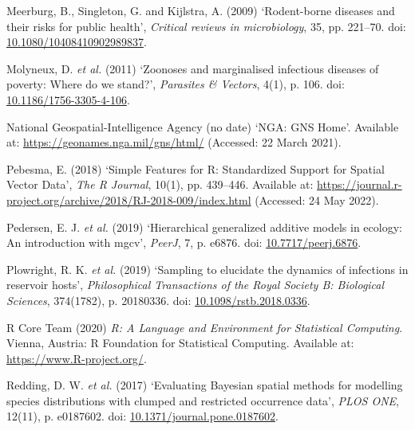 \documentclass[
]{article}
\newlength{\cslhangindent}
\newlength{\cslentryspacingunit} %
\newenvironment{CSLReferences}[2] %
 {%
  \setlength{\parindent}{0pt}
  \ifodd #1
  \let\oldpar\par
  \def\par{\hangindent=\cslhangindent\oldpar}
  \fi
  \setlength{\parskip}{#2\cslentryspacingunit}
 }%
 {}
\begin{document}
\begin{CSLReferences}{0}{0}
\leavevmode{}%
Meerburg, B., Singleton, G. and Kijlstra, A. (2009) {`Rodent-borne
diseases and their risks for public health'}, \emph{Critical reviews in
microbiology}, 35, pp. 221--70. doi:
\href{https://doi.org/10.1080/10408410902989837}{10.1080/10408410902989837}.

\leavevmode{}%
Molyneux, D. \emph{et al.} (2011) {`Zoonoses and marginalised infectious
diseases of poverty: {Where} do we stand?'}, \emph{Parasites \&
Vectors}, 4(1), p. 106. doi:
\href{https://doi.org/10.1186/1756-3305-4-106}{10.1186/1756-3305-4-106}.

\leavevmode{}%
National Geospatial-Intelligence Agency (no date) {`{NGA}: {GNS}
{Home}'}. Available at: \url{https://geonames.nga.mil/gns/html/}
(Accessed: 22 March 2021).

\leavevmode{}%
Pebesma, E. (2018) {`Simple {Features} for {R}: {Standardized} {Support}
for {Spatial} {Vector} {Data}'}, \emph{The R Journal}, 10(1), pp.
439--446. Available at:
\url{https://journal.r-project.org/archive/2018/RJ-2018-009/index.html}
(Accessed: 24 May 2022).

\leavevmode{}%
Pedersen, E. J. \emph{et al.} (2019) {`Hierarchical generalized additive
models in ecology: An introduction with mgcv'}, \emph{PeerJ}, 7, p.
e6876. doi:
\href{https://doi.org/10.7717/peerj.6876}{10.7717/peerj.6876}.

\leavevmode{}%
Plowright, R. K. \emph{et al.} (2019) {`Sampling to elucidate the
dynamics of infections in reservoir hosts'}, \emph{Philosophical
Transactions of the Royal Society B: Biological Sciences}, 374(1782), p.
20180336. doi:
\href{https://doi.org/10.1098/rstb.2018.0336}{10.1098/rstb.2018.0336}.

\leavevmode{}%
R Core Team (2020) \emph{R: {A} {Language} and {Environment} for
{Statistical} {Computing}}. Vienna, Austria: R Foundation for
Statistical Computing. Available at: \url{https://www.R-project.org/}.

\leavevmode{}%
Redding, D. W. \emph{et al.} (2017) {`Evaluating {Bayesian} spatial
methods for modelling species distributions with clumped and restricted
occurrence data'}, \emph{PLOS ONE}, 12(11), p. e0187602. doi:
\href{https://doi.org/10.1371/journal.pone.0187602}{10.1371/journal.pone.0187602}.


\end{CSLReferences}
\end{document}
